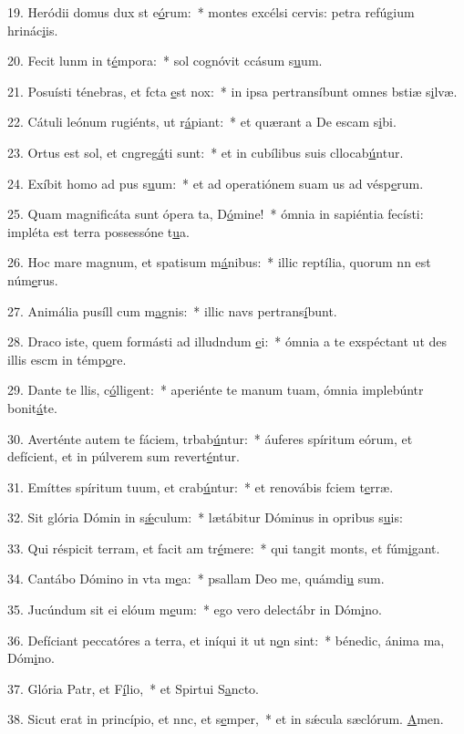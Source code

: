 19. Heródii domus dux st e\uline{ó}rum:~* montes excélsi cervis: petra refúgium hrinác\uline{i}is.\par 
20. Fecit lunm in t\uline{é}mpora:~* sol cognóvit ccásum s\uline{u}um.\par 
21. Posuísti ténebras, et fcta \uline{e}st nox:~* in ipsa pertransíbunt omnes bstiæ s\uline{i}lvæ.\par 
22. Cátuli leónum rugiénts, ut r\uline{á}piant:~* et quærant a De escam s\uline{i}bi.\par 
23. Ortus est sol, et cngreg\uline{á}ti sunt:~* et in cubílibus suis cllocab\uline{ú}ntur.\par 
24. Exíbit homo ad pus s\uline{u}um:~* et ad operatiónem suam us ad vésp\uline{e}rum.\par 
25. Quam magnificáta sunt ópera ta, D\uline{ó}mine!~* ómnia in sapiéntia fecísti: impléta est terra possessóne t\uline{u}a.\par 
26. Hoc mare magnum, et spatisum m\uline{á}nibus:~* illic reptília, quorum nn est núm\uline{e}rus.\par 
27. Animália pusíll cum m\uline{a}gnis:~* illic navs pertrans\uline{í}bunt.\par 
28. Draco iste, quem formásti ad illudndum \uline{e}i:~* ómnia a te exspéctant ut des illis escm in témp\uline{o}re.\par 
29. Dante te llis, c\uline{ó}lligent:~* aperiénte te manum tuam, ómnia implebúntr bonit\uline{á}te.\par 
30. Averténte autem te fáciem, trbab\uline{ú}ntur:~* áuferes spíritum eórum, et defícient, et in púlverem sum revert\uline{é}ntur.\par 
31. Emíttes spíritum tuum, et crab\uline{ú}ntur:~* et renovábis fciem t\uline{e}rræ.\par 
32. Sit glória Dómin in s\uline{ǽ}culum:~* lætábitur Dóminus in opribus s\uline{u}is:\par 
33. Qui réspicit terram, et facit am tr\uline{é}mere:~* qui tangit monts, et fúm\uline{i}gant.\par 
34. Cantábo Dómino in vta m\uline{e}a:~* psallam Deo me, quámdi\uline{u} sum.\par 
35. Jucúndum sit ei elóum m\uline{e}um:~* ego vero delectábr in Dóm\uline{i}no.\par 
36. Defíciant peccatóres a terra, et iníqui it ut n\uline{o}n sint:~* bénedic, ánima ma, Dóm\uline{i}no.\par 
37. Glória Patr, et F\uline{í}lio,~* et Spirtui S\uline{a}ncto.\par 
38. Sicut erat in princípio, et nnc, et s\uline{e}mper,~* et in sǽcula sæclórum. \uline{A}men.\par 
